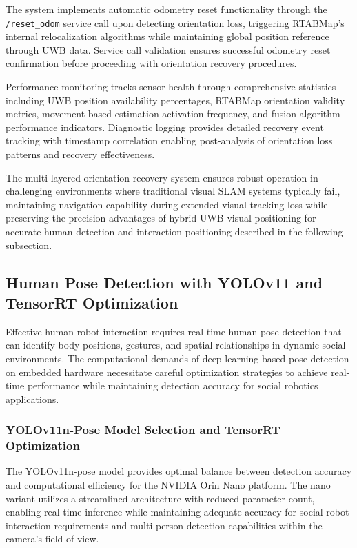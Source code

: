 The system implements automatic odometry reset functionality through the \texttt{/reset\_odom} service call upon detecting orientation loss, triggering RTABMap's internal relocalization algorithms while maintaining global position reference through UWB data. Service call validation ensures successful odometry reset confirmation before proceeding with orientation recovery procedures.

Performance monitoring tracks sensor health through comprehensive statistics including UWB position availability percentages, RTABMap orientation validity metrics, movement-based estimation activation frequency, and fusion algorithm performance indicators. Diagnostic logging provides detailed recovery event tracking with timestamp correlation enabling post-analysis of orientation loss patterns and recovery effectiveness.

The multi-layered orientation recovery system ensures robust operation in challenging environments where traditional visual SLAM systems typically fail, maintaining navigation capability during extended visual tracking loss while preserving the precision advantages of hybrid UWB-visual positioning for accurate human detection and interaction positioning described in the following subsection.



\subsection{Human Pose Detection with YOLOv11 and TensorRT Optimization}

Effective human-robot interaction requires real-time human pose detection that can identify body positions, gestures, and spatial relationships in dynamic social environments. The computational demands of deep learning-based pose detection on embedded hardware necessitate careful optimization strategies to achieve real-time performance while maintaining detection accuracy for social robotics applications.

\subsubsection{YOLOv11n-Pose Model Selection and TensorRT Optimization}

The YOLOv11n-pose model provides optimal balance between detection accuracy and computational efficiency for the NVIDIA Orin Nano platform. The nano variant utilizes a streamlined architecture with reduced parameter count, enabling real-time inference while maintaining adequate accuracy for social robot interaction requirements and multi-person detection capabilities within the camera's field of view.

